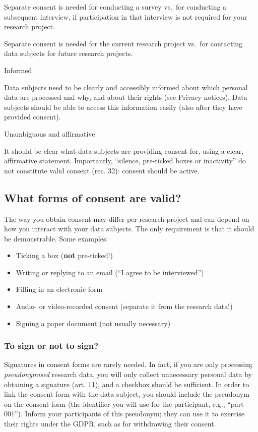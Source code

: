 \documentclass[
]{book}
\providecommand{\tightlist}{%
  \setlength{\itemsep}{0pt}\setlength{\parskip}{0pt}}
\begin{document}
Separate consent is needed for conducting a survey vs.~for conducting a
subsequent interview, if participation in that interview is not required for
your research project.

Separate consent is needed for the current research project vs.~for contacting
data subjects for future research projects.

Informed

Data subjects need to be clearly and accessibly informed about which personal
data are processed and why, and about their rights (see
Privacy notices). Data subjects should be
able to access this information easily (also after they have provided
consent).

Unambiguous and affirmative

It should be clear what data subjects are providing consent for, using
a clear, affirmative statement. Importantly, ``silence, pre-ticked boxes or
inactivity'' do not constitute valid consent
(rec. 32):
consent should be active.

\hypertarget{forms-consent}{%
\subsection{What forms of consent are valid?}\label{forms-consent}}

The way you obtain consent may differ per research project and can depend on
how you interact with your data subjects. The only requirement is that it should
be demonstrable. Some examples:

\begin{itemize}
\tightlist
\item
  Ticking a box (\textbf{not} pre-ticked!)
\item
  Writing or replying to an email (``I agree to be interviewed'')
\item
  Filling in an electronic form
\item
  Audio- or video-recorded consent (separate it from the research data!)
\item
  Signing a paper document (not usually necessary)
\end{itemize}

\hypertarget{to-sign-or-not-to-sign}{%
\subsubsection{To sign or not to sign?}\label{to-sign-or-not-to-sign}}

Signatures in consent forms are rarely needed. In fact, if you are only
processing \emph{pseudonymised} research data, you will only collect unnecessary
personal data by obtaining a signature
(art. 11), and a
checkbox should be sufficient. In order to link the consent form with the data
subject, you should include the pseudonym on the consent form (the identifier
you will use for the participant, e.g., ``part-001''). Inform your participants
of this pseudonym; they can use it to exercise their rights under the GDPR,
such as for withdrawing their consent.
\end{document}
